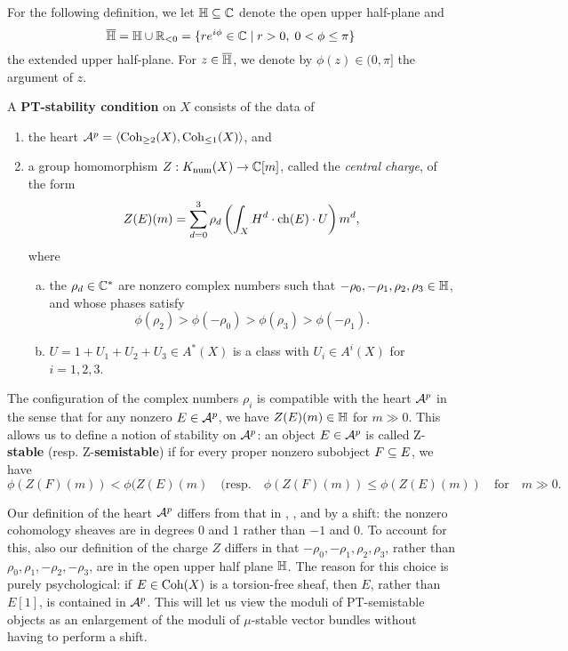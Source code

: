 For the following definition, we let $\mathbb{H} \subseteq \mathbb{C}$ denote the open upper half-plane and 
\[ \overline{\mathbb{H}} = \mathbb{H} \cup \mathbb{R}_{<0} = \{ r e^{i\phi} \in \mathbb{C} \;|\; r > 0, \; 0 < \phi \le \pi \} \]
the extended upper half-plane. For $z \in \overline{\mathbb{H}}$, we denote by $\phi(z) \in (0, \pi]$ the argument of $z$.
\begin{defn}\label{defn:PTstab}
    A \textbf{PT-stability condition} on $X$ consists of the data of
    \begin{enumerate}[(1)]
        \item the heart $\mathcal{A}^p = \langle \operatorname{\mathrm{Coh}}_{\ge 2}(X), \operatorname{\mathrm{Coh}}_{\le 1}(X) \rangle$, and
        \item a group homomorphism $Z: K_{\mathrm{num}}(X) \to \mathbb{C}[m]$, called the \emph{central charge}, of the form
        \[ Z(E)(m) = \sum_{d=0}^3 \rho_d \left(\int_X H^d \cdot \operatorname{\mathrm{ch}}(E) \cdot U\right) m^d, \]
        where
        \begin{enumerate}[(a)]
            \item the $\rho_d \in \mathbb{C}^*$ are nonzero complex numbers such that $-\rho_0, -\rho_1, \rho_2, \rho_3 \in \mathbb{H}$, and whose phases satisfy
            \[ \phi(\rho_2) > \phi(-\rho_0) > \phi(\rho_3) > \phi(-\rho_1). \]
            \item $U = 1 + U_1 + U_2 + U_3 \in A^*(X)$ is a class with $U_i \in A^i(X)$ for $i = 1, 2, 3$.
        \end{enumerate}
    \end{enumerate}
\end{defn}
The configuration of the complex numbers $\rho_i$ is compatible with the heart $\mathcal{A}^p$ in the sense that for any nonzero $E \in \mathcal{A}^p$, we have $Z(E)(m) \in \mathbb{H}$ for $m \gg 0$. This allows us to define a notion of stability on $\mathcal{A}^p$: an object $E \in \mathcal{A}^p$ is called Z-\textbf{stable} (resp. Z-\textbf{semistable}) if for every proper nonzero subobject $F \subseteq E$, we have 
\[ \phi(Z(F)(m)) < \phi(Z(E)(m) \quad (\mathrm{resp.} \quad \phi(Z(F)(m)) \le \phi(Z(E)(m)) \quad \mathrm{for} \quad m \gg 0. \]

\begin{rmk}
    Our definition of the heart $\mathcal{A}^p$ differs from that in \cite{lo-PT1}, \cite{lo-PT2}, and \cite{bayer-polynomial} by a shift: the nonzero cohomology sheaves are in degrees $0$ and $1$ rather than $-1$ and $0$. To account for this, also our definition of the charge $Z$ differs in that $-\rho_0, -\rho_1, \rho_2, \rho_3$, rather than $\rho_0, \rho_1, -\rho_2, -\rho_3$, are in the open upper half plane $\mathbb{H}$. The reason for this choice is purely psychological: if $E \in \operatorname{\mathrm{Coh}}(X)$ is a torsion-free sheaf, then $E$, rather than $E[1]$, is contained in $\mathcal{A}^p$. This will let us view the moduli of PT-semistable objects as an enlargement of the moduli of $\mu$-stable vector bundles without having to perform a shift.
\end{rmk} 

